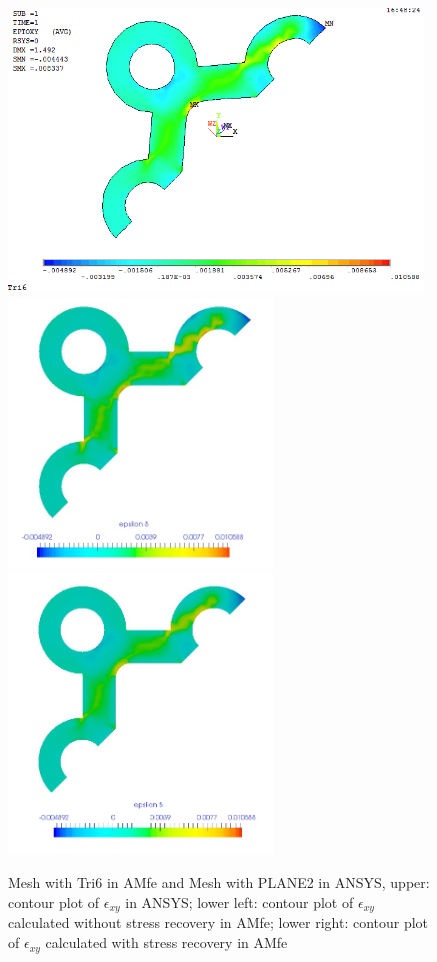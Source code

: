 \begin{figure}[htbp]
	\begin{center}
		\includegraphics[width=11cm,clip]{Tri6_Exy.png} 	
		\includegraphics[width=7cm,clip]{Tri6_Exy_PD.png} 	
		\includegraphics[width=7cm,clip]{Tri6_Exy_P.png} 		
		\caption{Mesh with Tri6 in AMfe and Mesh with PLANE2 in ANSYS, upper: contour plot of $\epsilon_{xy}$ in ANSYS; lower left: contour plot of $\epsilon_{xy}$ calculated without stress recovery in AMfe; lower right: contour plot of $\epsilon_{xy}$ calculated with stress recovery in AMfe} \label{fig: Tri6_Exy}
	\end{center}
\end{figure}
\clearpage 

